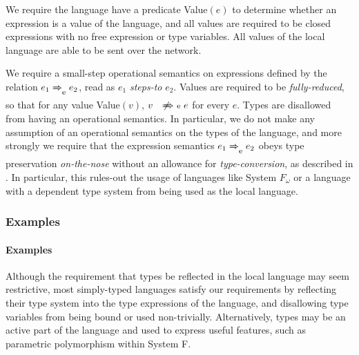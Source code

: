 We require the language have a predicate Value$(e)$ to determine whether an expression is a value of the language, and all values are required to be closed expressions with no free expression or type variables.
All values of the local language are able to be sent over the network.

We require a small-step operational semantics on expressions defined by the relation $e_1 \localstep{} e_2$, read as $e_1$ \emph{steps-to} $e_2$.
Values are required to be \emph{fully-reduced}, so that for any value Value$(v)$, $v \nlocalstep{} e$ for every $e$.
Types are disallowed from having an operational semantics.
In particular, we do not make any assumption of an operational semantics on the types of the language, and more strongly we require that the expression semantics $e_1 \localstep{} e_2$ obeys type preservation \emph{on-the-nose} without an allowance for \emph{type-conversion}, as described in \todo.
In particular, this rules-out the usage of languages like System $F_\omega$ or a language with a dependent type system from being used as the local language.

\iftr\subsubsection{Examples}\else\paragraph{Examples}\fi
\label{sec:loc-lang-examples}

Although the requirement that types be reflected in the local language may seem restrictive, most simply-typed languages satisfy our requirements by reflecting their type system into the type expressions of the language, and disallowing type variables from being bound or used non-trivially.
Alternatively, types may be an active part of the language and used to express useful features, such as parametric polymorphism within System F.

